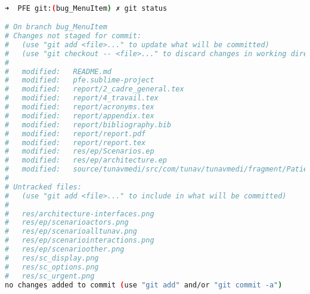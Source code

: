 \begin{lstlisting}[language=bash, label=lst:git_status, caption=Git status]

➜  PFE git:(bug_MenuItem) ✗ git status

# On branch bug_MenuItem
# Changes not staged for commit:
#   (use "git add <file>..." to update what will be committed)
#   (use "git checkout -- <file>..." to discard changes in working directory)
#
#   modified:   README.md
#   modified:   pfe.sublime-project
#   modified:   report/2_cadre_general.tex
#   modified:   report/4_travail.tex
#   modified:   report/acronyms.tex
#   modified:   report/appendix.tex
#   modified:   report/bibliography.bib
#   modified:   report/report.pdf
#   modified:   report/report.tex
#   modified:   res/ep/Scenarios.ep
#   modified:   res/ep/architecture.ep
#   modified:   source/tunavmedi/src/com/tunav/tunavmedi/fragment/PatientListFragment.java
#
# Untracked files:
#   (use "git add <file>..." to include in what will be committed)
#
#   res/architecture-interfaces.png
#   res/ep/scenarioactors.png
#   res/ep/scenarioalltunav.png
#   res/ep/scenariointeractions.png
#   res/ep/scenarioother.png
#   res/sc_display.png
#   res/sc_options.png
#   res/sc_urgent.png
no changes added to commit (use "git add" and/or "git commit -a")

\end{lstlisting}

\begin{lstlisting}[language=bash, label=lst:git_merge, caption=Git merge]

\end{lstlisting}
